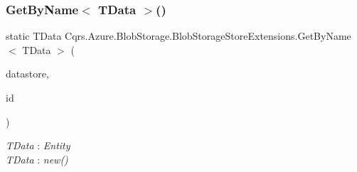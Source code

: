 \subsubsection{\texorpdfstring{Get\+By\+Name$<$ T\+Data $>$()}{GetByName< TData >()}\hspace{0.1cm}{\footnotesize\ttfamily [2/2]}}
{\footnotesize\ttfamily static T\+Data Cqrs.\+Azure.\+Blob\+Storage.\+Blob\+Storage\+Store\+Extensions.\+Get\+By\+Name$<$ T\+Data $>$ (\begin{DoxyParamCaption}\item[{this \hyperlink{interfaceCqrs_1_1DataStores_1_1IDataStore}{I\+Data\+Store}$<$ T\+Data $>$}]{datastore,  }\item[{Guid}]{id }\end{DoxyParamCaption})\hspace{0.3cm}{\ttfamily [static]}}

\begin{Desc}
\item[Type Constraints]\begin{description}
\item[{\em T\+Data} : {\em Entity}]\item[{\em T\+Data} : {\em new()}]\end{description}
\end{Desc}
